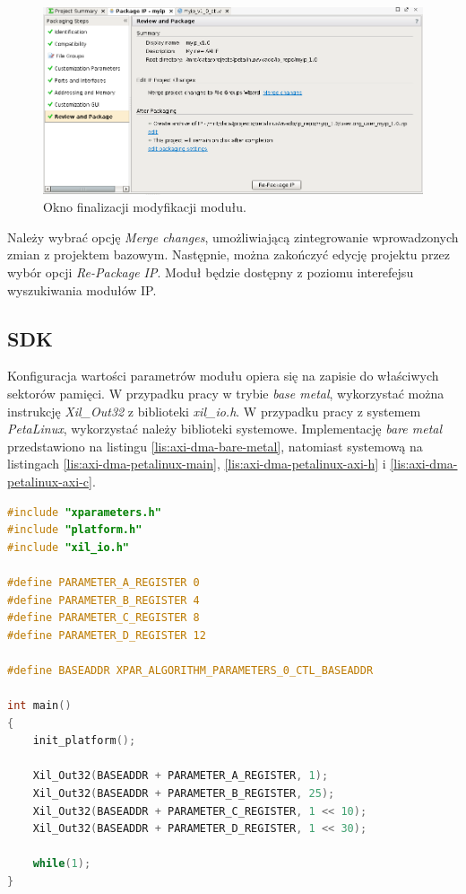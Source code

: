 \begin{figure}[ht]
	\centering
	\includegraphics[width=12cm]{img/vivado/axi-dma-review-package.png}
	\caption{Okno finalizacji modyfikacji modułu.}
	\label{fig:axi-dma-review-package}
\end{figure}

Należy wybrać opcję \emph{Merge changes}, umożliwiającą zintegrowanie wprowadzonych zmian z projektem bazowym. Następnie, można zakończyć edycję projektu przez wybór opcji \emph{Re-Package IP}. Moduł będzie dostępny z poziomu interefejsu wyszukiwania modułów IP.

\subsection{SDK}
\label{sec:vivado-axi-dma-sdk}
Konfiguracja wartości parametrów modułu opiera się na zapisie do właściwych sektorów pamięci. W przypadku pracy w trybie \emph{base metal}, wykorzystać można instrukcję \emph{Xil\_Out32} z biblioteki \emph{xil\_io.h}. W przypadku pracy z systemem \emph{PetaLinux}, wykorzystać należy biblioteki systemowe. Implementację \emph{bare metal} przedstawiono na listingu \ref{lis:axi-dma-bare-metal}, natomiast systemową na listingach \ref{lis:axi-dma-petalinux-main}, \ref{lis:axi-dma-petalinux-axi-h} i \ref{lis:axi-dma-petalinux-axi-c}.

\begin{lstlisting}[breaklines, language=C, label=lis:axi-dma-bare-metal, caption=Obsługa modułu w trybie \emph{bare metal}.]
#include "xparameters.h"
#include "platform.h"
#include "xil_io.h"

#define PARAMETER_A_REGISTER 0
#define PARAMETER_B_REGISTER 4
#define PARAMETER_C_REGISTER 8
#define PARAMETER_D_REGISTER 12

#define BASEADDR XPAR_ALGORITHM_PARAMETERS_0_CTL_BASEADDR

int main()
{
	init_platform();
	
	Xil_Out32(BASEADDR + PARAMETER_A_REGISTER, 1);
	Xil_Out32(BASEADDR + PARAMETER_B_REGISTER, 25);
	Xil_Out32(BASEADDR + PARAMETER_C_REGISTER, 1 << 10);
	Xil_Out32(BASEADDR + PARAMETER_D_REGISTER, 1 << 30);
	
	while(1);
}
\end{lstlisting}



